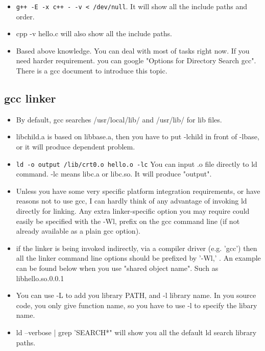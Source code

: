 \documentclass[a4paper,12pt,twoside]{book}
\begin{document}
\begin{itemize}
\begin{itemize}
		\item \verb=g++ -E -x c++ - -v < /dev/null=. It will show all the include paths and order. 

		\item cpp -v hello.c will also show all the include paths. 

		\item Based above knowledge. You can deal with most of tasks right now. If you need harder requirement. you can google "Options for Directory Search gcc". There is a gcc document to introduce this topic. 
		
			\end{itemize}

\subsection{gcc linker}
			 \begin{itemize}
			 \item By default, gcc searches /usr/local/lib/ and /usr/lib/ for lib files.
			 
			 \item libchild.a is based on libbase.a, then you have to put -lchild in front of -lbase, or it will produce dependent problem. 
			 
			\item \verb=ld -o output /lib/crt0.o hello.o -lc= You can input .o file directly to ld command. -lc means libc.a or libc.so. It will produce "output". 
					 
			\item Unless you have some very specific platform integration requirements, or have reasons not to use gcc, I can hardly think of any advantage of invoking ld directly for linking. Any extra linker-specific option you may require could easily be specified with the -Wl, prefix on the gcc command line (if not already available as a plain gcc option).

			 \item if the linker is being invoked indirectly, via a compiler driver (e.g. 'gcc') then all the linker command line options should be prefixed by '-Wl,' . An example can be found below when you use "shared object name". Such as libhello.so.0.0.1

    \item You can use -L to add you library PATH, and -l library name. In you source code, you only give function name, so you have to use -l to specify the libary name. 

	\item ld --verbose | grep 'SEARCH*" will show you all the default ld search library paths.
			

\end{itemize}
\end{itemize}
\end{document}
